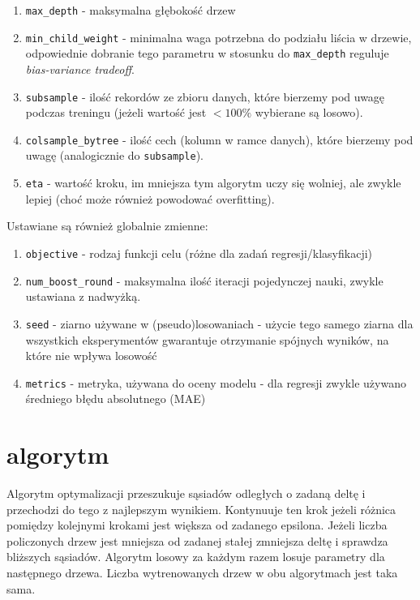 \documentclass[a4paper,12p]{article}
\begin{document}
	\begin{enumerate}
		\item \texttt{max\_depth} - maksymalna głębokość drzew
		\item \texttt{min\_child\_weight} - minimalna waga potrzebna do podziału liścia w drzewie, odpowiednie dobranie tego parametru w stosunku do \texttt{max\_depth} reguluje \textit{bias-variance tradeoff}.
		\item \texttt{subsample} - ilość rekordów ze zbioru danych, które bierzemy pod uwagę podczas treningu (jeżeli wartość jest $< 100\%$ wybierane są losowo).
		\item \texttt{colsample\_bytree} - ilość cech (kolumn w ramce danych), które bierzemy pod uwagę (analogicznie do \texttt{subsample}).
		\item \texttt{eta} - wartość kroku, im mniejsza tym algorytm uczy się wolniej, ale zwykle lepiej (choć może również powodować overfitting).
	\end{enumerate}

	
	Ustawiane są również globalnie zmienne:
	
	\begin{enumerate}
		\item \texttt{objective} - rodzaj funkcji celu (różne dla zadań regresji/klasyfikacji)
		\item \texttt{num\_boost\_round} - maksymalna ilość iteracji pojedynczej nauki, zwykle ustawiana z nadwyżką.
		\item \texttt{seed} - ziarno używane w (pseudo)losowaniach  - użycie tego samego ziarna dla wszystkich eksperymentów gwarantuje otrzymanie spójnych wyników, na które nie wpływa losowość
		\item \texttt{metrics} - metryka, używana do oceny modelu - dla regresji zwykle używano średniego błędu absolutnego (MAE)
	\end{enumerate}
	
	\section{algorytm}
	Algorytm optymalizacji przeszukuje sąsiadów odległych o zadaną deltę i przechodzi do tego z najlepszym wynikiem. Kontynuuje ten krok jeżeli różnica pomiędzy kolejnymi krokami jest większa od zadanego epsilona. Jeżeli liczba policzonych drzew jest mniejsza od zadanej stałej zmniejsza deltę i sprawdza bliższych sąsiadów. 
	Algorytm losowy za każdym razem losuje parametry dla następnego drzewa. Liczba wytrenowanych drzew w obu algorytmach jest taka sama. 
	
\end{document}
